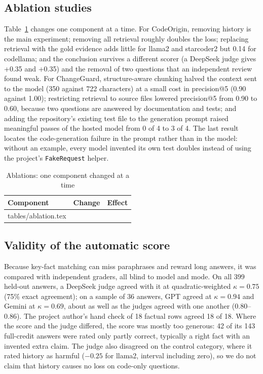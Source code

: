 \documentclass[12pt,onecolumn,draftclsnofoot]{IEEEtran}
\makeatletter
\newcommand{\tablerows}[1]{\@@input #1 }
\makeatother
\begin{document}
\subsection{Ablation studies}
Table~\ref{tab:ablation} changes one component at a time. For CodeOrigin, removing history is the main experiment; removing all retrieval roughly doubles the loss; replacing retrieval with the gold evidence adds little for llama2 and starcoder2 but 0.14 for codellama; and the conclusion survives a different scorer (a DeepSeek judge gives +0.35 and +0.35) and the removal of two questions that an independent review found weak. For ChangeGuard, structure-aware chunking halved the context sent to the model (350 against 722 characters) at a small cost in precision@5 (0.90 against 1.00); restricting retrieval to source files lowered precision@5 from 0.90 to 0.60, because two questions are answered by documentation and tests; and adding the repository's existing test file to the generation prompt raised meaningful passes of the hosted model from 0 of 4 to 3 of 4. The last result locates the code-generation failure in the prompt rather than in the model: without an example, every model invented its own test doubles instead of using the project's \texttt{FakeRequest} helper.

\begin{table}[!t]
\caption{Ablations: one component changed at a time}
\label{tab:ablation}
\centering
\scriptsize
\setlength{\tabcolsep}{3pt}
\begin{tabular}{@{}p{3.6cm}p{4.4cm}p{6.6cm}@{}}
\toprule
Component & Change & Effect \\
\midrule
\tablerows{tables/ablation.tex}
\end{tabular}
\end{table}

\subsection{Validity of the automatic score}
Because key-fact matching can miss paraphrases and reward long answers, it was compared with independent graders, all blind to model and mode. On all 399 held-out answers, a DeepSeek judge agreed with it at quadratic-weighted $\kappa=0.75$ (75\% exact agreement); on a sample of 36 answers, GPT agreed at $\kappa=0.94$ and Gemini at $\kappa=0.69$, about as well as the judges agreed with one another (0.80--0.86). The project author's hand check of 18 factual rows agreed 18 of 18. Where the score and the judge differed, the score was mostly too generous: 42 of its 143 full-credit answers were rated only partly correct, typically a right fact with an invented extra claim. The judge also disagreed on the control category, where it rated history as harmful ($-0.25$ for llama2, interval including zero), so we do not claim that history causes no loss on code-only questions.
\end{document}
